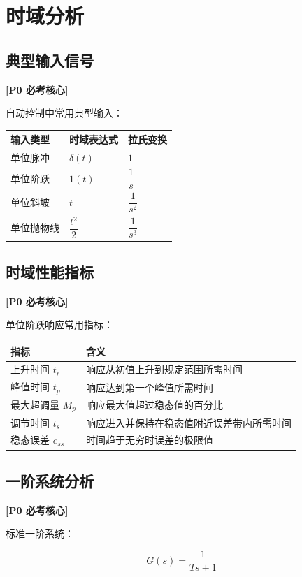 \documentclass[UTF8,a4paper,12pt]{ctexart}
\newcommand{\Pzero}{\textcolor{p0}{\textbf{[P0 必考核心]}}}
\begin{document}
\section{时域分析}

\subsection{典型输入信号}

\Pzero

自动控制中常用典型输入：

\begin{longtable}{p{4cm}p{5cm}p{5cm}}
\toprule
输入类型 & 时域表达式 & 拉氏变换 \\
\midrule
单位脉冲 & $\delta(t)$ & $1$ \\
单位阶跃 & $1(t)$ & $\dfrac{1}{s}$ \\
单位斜坡 & $t$ & $\dfrac{1}{s^2}$ \\
单位抛物线 & $\dfrac{t^2}{2}$ & $\dfrac{1}{s^3}$ \\
\bottomrule
\end{longtable}

\subsection{时域性能指标}

\Pzero

单位阶跃响应常用指标：

\begin{longtable}{p{4cm}p{10cm}}
\toprule
指标 & 含义 \\
\midrule
上升时间 $t_r$ & 响应从初值上升到规定范围所需时间 \\
峰值时间 $t_p$ & 响应达到第一个峰值所需时间 \\
最大超调量 $M_p$ & 响应最大值超过稳态值的百分比 \\
调节时间 $t_s$ & 响应进入并保持在稳态值附近误差带内所需时间 \\
稳态误差 $e_{ss}$ & 时间趋于无穷时误差的极限值 \\
\bottomrule
\end{longtable}

\subsection{一阶系统分析}

\Pzero

标准一阶系统：

\[
G(s)=\frac{1}{Ts+1}
\]
\end{document}
